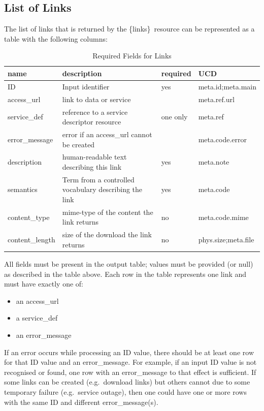 \documentclass[11pt,a4paper]{ivoa}
\newcommand{\blinks}{\{links\}}
\begin{document}
\subsection{List of Links}

The list of links that is returned by the \blinks\ resource can be
represented as a table with the following columns:
\begin{table}[h]
\begin{center}
\begin{tabular}{|l|l|l|l|}
\hline
{\bf name}      & {\bf description} & {\bf required} & {\bf UCD} \\
\hline
ID              & Input identifier & yes & meta.id;meta.main \\
\hline
access\_url     & link to data or service
                &          & meta.ref.url \\
\cline{1-2} \cline{4-4}
service\_def    & reference to a service descriptor resource
                & one only & meta.ref \\
\cline{1-2} \cline{4-4}
error\_message  & error if an access\_url cannot be created
                &          & meta.code.error \\
\hline
description     & human-readable text describing this link
                & yes & meta.note \\
\hline
semantics       & Term from a controlled vocabulary describing the link
                & yes & meta.code \\
\hline
content\_type   & mime-type of the content the link returns
                & no & meta.code.mime \\
\hline
content\_length & size of the download the link returns
                & no & phys.size;meta.file \\
\hline
\end{tabular}
\end{center}
\caption{Required Fields for Links}
\end{table}

All fields must be present in the output table; values must be provided
(or null) as described in the table above. Each row in the table
represents one link and must have exactly one of:
\begin{itemize}
  \item an access\_url
  \item a service\_def
  \item an error\_message
\end{itemize}

If an error occurs while processing an ID value, there should be at least
one row for that ID value and an error\_message. For example, if an input
ID value is not recognised or found, one row with an error\_message
to that effect is sufficient.
If some links can be created (e.g.\ download links)
but others cannot due to some temporary failure (e.g.\ service outage),
then one could have one or more rows with the same ID and different
error\_message(s).
\end{document}
